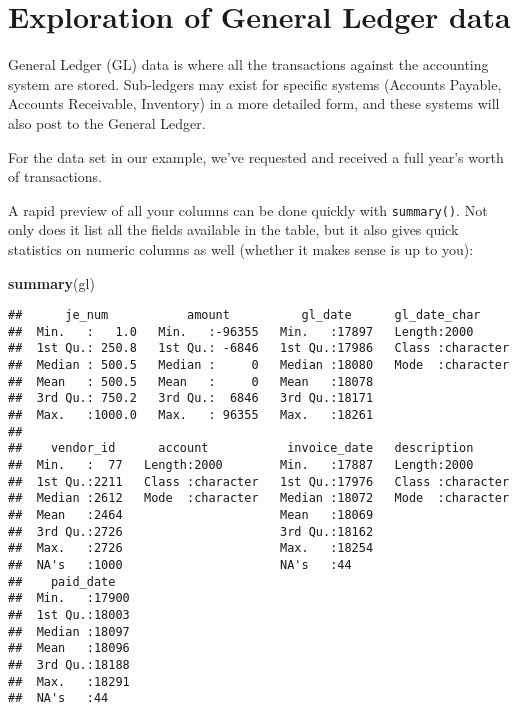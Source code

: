 \documentclass[
]{book}
\newenvironment{Shaded}{\begin{snugshade}}{\end{snugshade}}
\newcommand{\KeywordTok}[1]{\textcolor[rgb]{0.13,0.29,0.53}{\textbf{#1}}}
\newcommand{\NormalTok}[1]{#1}
\begin{document}
\hypertarget{exploration-of-general-ledger-data}{%
\section{Exploration of General Ledger data}\label{exploration-of-general-ledger-data}}

General Ledger (GL) data is where all the transactions against the accounting system are stored. Sub-ledgers may exist for specific systems (Accounts Payable, Accounts Receivable, Inventory) in a more detailed form, and these systems will also post to the General Ledger.

For the data set in our example, we've requested and received a full year's worth of transactions.

A rapid preview of all your columns can be done quickly with \texttt{summary()}. Not only does it list all the fields available in the table, but it also gives quick statistics on numeric columns as well (whether it makes sense is up to you):

\begin{Shaded}
\begin{Highlighting}[]
\KeywordTok{summary}\NormalTok{(gl)}
\end{Highlighting}
\end{Shaded}

\begin{verbatim}
##      je_num           amount          gl_date      gl_date_char      
##  Min.   :   1.0   Min.   :-96355   Min.   :17897   Length:2000       
##  1st Qu.: 250.8   1st Qu.: -6846   1st Qu.:17986   Class :character  
##  Median : 500.5   Median :     0   Median :18080   Mode  :character  
##  Mean   : 500.5   Mean   :     0   Mean   :18078                     
##  3rd Qu.: 750.2   3rd Qu.:  6846   3rd Qu.:18171                     
##  Max.   :1000.0   Max.   : 96355   Max.   :18261                     
##                                                                      
##    vendor_id      account           invoice_date   description       
##  Min.   :  77   Length:2000        Min.   :17887   Length:2000       
##  1st Qu.:2211   Class :character   1st Qu.:17976   Class :character  
##  Median :2612   Mode  :character   Median :18072   Mode  :character  
##  Mean   :2464                      Mean   :18069                     
##  3rd Qu.:2726                      3rd Qu.:18162                     
##  Max.   :2726                      Max.   :18254                     
##  NA's   :1000                      NA's   :44                        
##    paid_date    
##  Min.   :17900  
##  1st Qu.:18003  
##  Median :18097  
##  Mean   :18096  
##  3rd Qu.:18188  
##  Max.   :18291  
##  NA's   :44
\end{verbatim}
\end{document}
